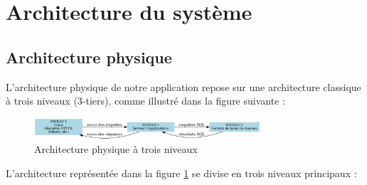 \section{Architecture du système}
\subsection{Architecture physique}

L’architecture physique de notre application repose sur une architecture classique à trois niveaux (3-tiers), comme illustré dans la figure suivante :

\begin{figure}[H]
    \centering
    \includegraphics[width=0.75\textwidth]{figures/architecture_physique.png}
    \caption{Architecture physique à trois niveaux}
    \label{fig:architecture_physique}
\end{figure}

L’architecture représentée dans la figure \ref{fig:architecture_physique} se divise en trois niveaux principaux :

